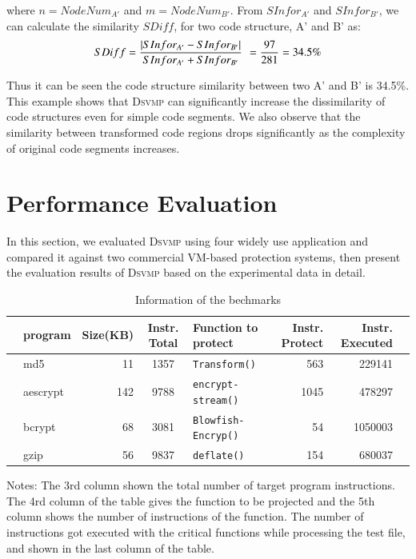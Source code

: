 \documentclass[preprint,12pt,3p]{elsarticle}
\newcommand{\DSVMP}{\textsc{Dsvmp }}
\begin{document}
where $n=NodeNu{m_{A'}}$ and $m=NodeNu{m_{B'}}$.
From $SInfo{r_{A'}}$ and $SInfo{r_{B'}}$,
we can calculate the similarity $SDiff$, for two code structure, A' and B' as:
\begin{align*}
SDiff = \frac{{|SInfo{r_{A'}} - SInfo{r_{B'}}|}}{{SInfo{r_{A'}} + SInfo{r_{B'}}}}\;{\kern 1pt}  = \frac{{97}}{{281}} = 34.5\% \end{align*}

Thus it can be seen the code structure similarity between two A' and B' is  34.5\%.
This example shows that \DSVMP can significantly increase the dissimilarity of code structures even for simple code segments.
We also observe that the similarity between transformed code regions drops significantly
as the complexity of original code segments increases.


\section{Performance Evaluation}\label{sec:p-eva}
In this section, we evaluated \DSVMP using four widely use application
and compared it against two commercial VM-based protection systems,
then present the evaluation results of \DSVMP based on the experimental data in detail.

\begin{table}[!h]
\scriptsize
\begin{center}
\caption{Information of the bechmarks\label{tab:Tab.3}}
{\begin{tabular}{@{}rlrclrrl@{}}\hline
   & \textbf{program} & \textbf{Size(KB)} & \textbf{Instr. Total} & \textbf{Function to protect} & \textbf{Instr. Protect} & \textbf{Instr. Executed} & \\
  \hline
   & md5 & 11 & 1357 & \texttt{Transform()} & 563 & 229141 & \\
   & aescrypt & 142 & 9788 &\texttt{encrypt-stream()} & 1045 & 478297 & \\
   & bcrypt & 68 & 3081 & \texttt{Blowfish-Encryp()} & 54 & 1050003 & \\
   & gzip & 56 & 9837 & \texttt{deflate()} & 154 & 680037 & \\
  \hline
\end{tabular}}{}
\end{center}
Notes: The 3rd column shown the total number of target program instructions. The 4rd column of the table gives the function to be projected and the 5th column shows the number of instructions of the function. The number of instructions got executed with the critical functions while processing the test file, and shown in the last column of the table.
\end{table}
\end{document}
